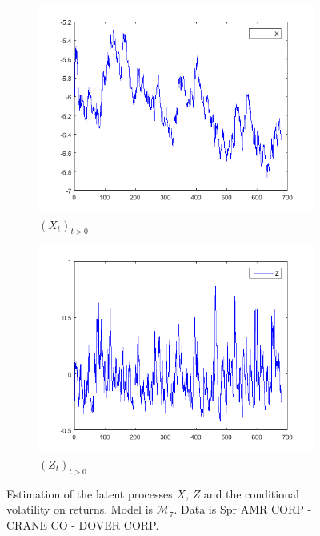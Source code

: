 \documentclass[11pt,a4,twosided,singlespacing,titlepagenumber=on]{scrreprt}
\numberwithin{equation}{chapter} %
\theoremstyle{remark}
\begin{document}
\begin{figure}[H]
    \centering
    \begin{subfigure}[t]{0.49\textwidth}
        \centering
        \includegraphics[width=1\textwidth]{est/1}
        \caption{$(X_t)_{t>0}$}
        \label{est_1}
    \end{subfigure}
    \begin{subfigure}[t]{0.49\textwidth}
        \centering
        \includegraphics[width=1\textwidth]{est/2}
        \caption{$(Z_t)_{t>0}$}
        \label{est_2}
    \end{subfigure}
    \caption{Estimation of the latent processes $X$, $Z$ and the conditional volatility on returns. Model is $\mathcal{M}_7$. Data is Spr AMR CORP - CRANE CO - DOVER CORP.}
    \label{estimation_of_latent_processes}
\end{figure}
\end{document}
